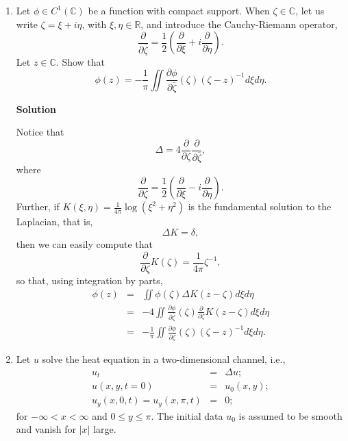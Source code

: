 \documentclass{article}
\begin{document}
\begin{enumerate}
{\bf Solution}

Denote by
\[z(t) = a + \int_0^t f(s) y(s)^2 ds,\]
and note that
\[z'(t) = f(t) y(t)^2 \leq f(t) z(t)^2.\]
It follows that
\[\int_0^t \frac{z'(s)}{z(s)^2} ds \leq \int_0^t f(s) ds \ 
  \Rightarrow \ \frac{1}{z(0)} - \frac{1}{z(t)} \leq \int_0^t f(s) ds \ 
  \Rightarrow \ z(t) \leq \frac{a}{1 - a \int_0^t f(s) ds},\]
from which the claim follows.



\item Let \(\phi \in C^1(\mathbb{C})\) be a function with compact support.  When \(\zeta \in \mathbb{C}\), let us write \(\zeta = \xi + i \eta\), with \(\xi,\eta \in \mathbb{R}\), and introduce the Cauchy-Riemann operator,
\[\frac{\partial}{\partial \overline{\zeta}} = \frac{1}{2} \left( \frac{\partial}{\partial \xi} + i \frac{\partial}{\partial \eta} \right).\]
Let \(z \in \mathbb{C}\).  Show that
\[\phi(z) = -\frac{1}{\pi} \iint \frac{\partial \phi}{\partial \overline{\zeta}} (\zeta) (\zeta - z)^{-1} d\xi d\eta.\]

{\bf Solution}

Notice that
\[\Delta = 4 \frac{\partial}{\partial \zeta} \frac{\partial}{\partial \overline{\zeta}},\]
where
\[\frac{\partial}{\partial \zeta} = \frac{1}{2} \left( \frac{\partial}{\partial \xi} - i \frac{\partial}{\partial \eta} \right).\]
Further, if \(K(\xi,\eta) = \frac{1}{4 \pi} \log (\xi^2 + \eta^2)\) is the fundamental solution to the Laplacian, that is,
\[\Delta K = \delta,\]
then we can easily compute that
\[\frac{\partial}{\partial \zeta} K(\zeta) = \frac{1}{4 \pi} \zeta^{-1},\]
so that, using integration by parts,
\begin{eqnarray*}
\phi(z) & = & \iint \phi(\zeta) \Delta K(z - \zeta) d\xi d\eta \\
        & = & -4 \iint \frac{\partial \phi}{\partial \overline{\zeta}}(\zeta) \frac{\partial}{\partial \zeta} K(z - \zeta) d\xi d\eta \\
        & = & -\frac{1}{\pi} \iint \frac{\partial \phi}{\partial \overline{\zeta}}(\zeta) (\zeta - z)^{-1} d\xi d\eta.
\end{eqnarray*}




\item Let \(u\) solve the heat equation in a two-dimensional channel, i.e.,
\begin{eqnarray*}
u_t & = & \Delta u; \\
u(x,y,t = 0) & = & u_0(x,y); \\
u_y(x,0,t) = u_y(x,\pi,t) & = & 0;
\end{eqnarray*}
for \(-\infty < x < \infty\) and \(0 \leq y \leq \pi\).  The initial data \(u_0\) is assumed to be smooth and vanish for \(|x|\) large.


\end{enumerate}
\end{document}
